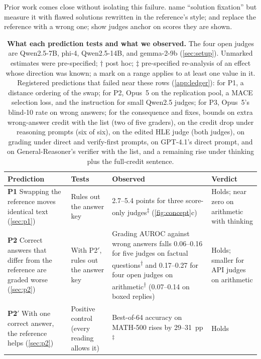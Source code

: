 \documentclass{article}
\newcommand{\reana}{\textsuperscript{$\ddagger$}}
\newcommand{\ph}{\textsuperscript{$\dagger$}}
\begin{document}
Prior work comes close without isolating this failure.
\citet{fixation2025} name ``solution fixation'' but measure it with flawed solutions rewritten in the reference's style; \citet{judgingref2026} and \citet{krumdick2025nofreelabels} replace the reference with a wrong one; \citet{kapetanovic2026anchoring} show judges anchor on scores they are shown.

\begin{table}[t]
\centering
\footnotesize
\caption{\textbf{What each prediction tests and what we observed.} The four open judges are Qwen2.5-7B, phi-4, Qwen2.5-14B, and gemma-2-9b (\cref{sec:setup}). Unmarked estimates were pre-specified; $\dagger$ post hoc; $\ddagger$ pre-specified re-analysis of an effect whose direction was known; a mark on a range applies to at least one value in it. Registered predictions that failed near these rows (\cref{app:ledger}): for P1, a distance ordering of the swap; for P2, Opus~5 on the replication pool, a \textsc{MACE} selection loss, and the instruction for small Qwen2.5 judges; for P3, Opus~5's blind-10 rate on wrong answers; for the consequence and fixes, bounds on extra wrong-answer credit with the list (two of five graders), on the credit drop under reasoning prompts (six of six), on the edited HLE judge (both judges), on grading under direct and verify-first prompts, on GPT-4.1's direct prompt, and on General-Reasoner's verifier with the list, and a remaining rise under thinking plus the full-credit sentence.}
\label{tab:summary}
\setlength{\tabcolsep}{3.5pt}
\renewcommand{\arraystretch}{1.08}
\begin{tabular}{L{2.65cm}L{2.15cm}L{5.7cm}L{2.4cm}}
\toprule
Prediction & Tests & Observed & Verdict \\
\midrule
\textbf{P1} Swapping the reference moves identical text (\cref{sec:p1}) & Rules out the answer key & 2.7--5.4 points for three score-only judges\reana{} (\cref{fig:concept}c) & Holds; near zero on arithmetic with thinking \\
\addlinespace[2pt]
\textbf{P2} Correct answers that differ from the reference are graded worse (\cref{sec:p2}) & With P2$'$, rules out the answer key & Grading AUROC against wrong answers falls 0.06--0.16 for five judges on factual questions\ph{} and 0.17--0.27 for four open judges on arithmetic\ph{} (0.07--0.14 on boxed replies) & Holds; smaller for API judges on arithmetic \\
\addlinespace[2pt]
\textbf{P2$'$} With one correct answer, the reference helps (\cref{sec:p2}) & Positive control (every reading allows it) & Best-of-64 accuracy on MATH-500 rises by 29--31~pp\reana & Holds \\

\end{tabular}
\end{table}
\end{document}
